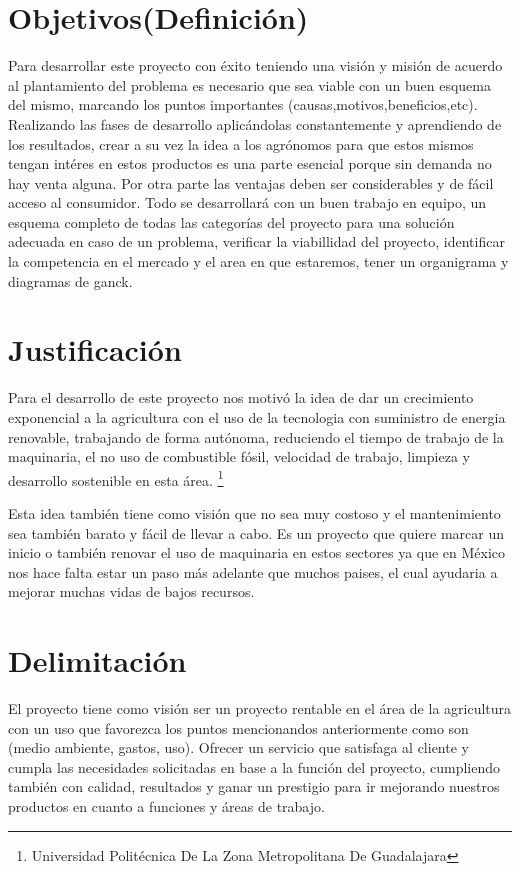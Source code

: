 \documentclass[11pt,a4paper]{article}
\begin{document}
\section{Objetivos(Definición)}

Para desarrollar este proyecto con éxito teniendo una visión y misión de acuerdo al plantamiento del problema es necesario que sea viable con un buen esquema del mismo, marcando los puntos importantes (causas,motivos,beneficios,etc). Realizando las fases de desarrollo aplicándolas constantemente y aprendiendo de los resultados, crear a su vez la idea a los agrónomos para que estos mismos tengan intéres en estos productos es 
una parte esencial porque sin demanda no hay venta alguna. Por otra parte las ventajas deben ser considerables y de fácil acceso al consumidor.
Todo se desarrollará con un buen trabajo en equipo, un esquema completo de todas las categorías del proyecto para una solución adecuada en caso de un problema, verificar la viabillidad del proyecto, identificar la competencia en el mercado y el area en que estaremos, tener un organigrama y diagramas de ganck.

\section{Justificación}
 Para el desarrollo de este proyecto nos motivó la idea de dar un crecimiento exponencial a la agricultura con el uso de la tecnologia con suministro de energia renovable, trabajando de forma autónoma, reduciendo el tiempo de trabajo de la maquinaria, el no uso de combustible fósil, velocidad de trabajo, limpieza y desarrollo sostenible en esta área.
 \footnote{Universidad Politécnica De La Zona Metropolitana De Guadalajara} 

\newpage
Esta idea también tiene como visión que no sea muy costoso y el mantenimiento sea también barato y fácil de llevar a cabo. Es un proyecto que quiere marcar un inicio o también renovar el uso de maquinaria en estos sectores ya que en México nos hace falta estar un paso más adelante que muchos paises, el cual ayudaria a mejorar muchas vidas de bajos recursos.
 
 
 \section{Delimitación}
 El proyecto tiene como visión ser un proyecto rentable en el área de la agricultura con un uso que favorezca los puntos mencionandos anteriormente como son (medio ambiente, gastos, uso). Ofrecer un servicio que satisfaga al cliente y cumpla las necesidades solicitadas en base a la función del proyecto, cumpliendo también con calidad, resultados y ganar un prestigio para ir mejorando nuestros productos en cuanto a funciones y áreas de trabajo.\\
\end{document}

